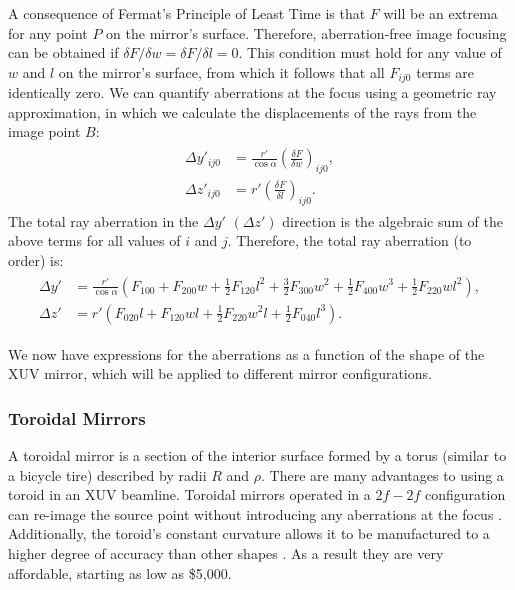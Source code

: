 A consequence of Fermat's Principle of Least Time is that $F$ will be an extrema for any point $P$ on the mirror's surface. Therefore, aberration-free image focusing can be obtained if $\delta F/\delta w = \delta F / \delta l = 0$. This condition must hold for any value of $w$ and $l$ on the mirror's surface, from which it follows that all $F_{ij0}$ terms are identically zero. We can quantify aberrations at the focus using a geometric ray approximation, in which we calculate the displacements of the rays from the image point $B$:
\begin{gather}
\begin{aligned}
\Delta y'_{ij0} &= \frac{r'}{\cos \alpha} \left( \frac{\delta F}{\delta w} \right)_{ij0}, \\
\Delta z'_{ij0} &= r' \left( \frac{\delta F}{\delta l} \right)_{ij0}.
\end{aligned}
\end{gather}
The total ray aberration in the $\Delta y'$ $(\Delta z')$ direction is the algebraic sum of the above terms for all values of $i$ and $j$. Therefore, the total ray aberration (to  order) is:
\begin{gather}
\begin{aligned}
\Delta y' &= \frac{r'}{\cos \alpha} \left( F_{100} + F_{200} w + \frac{1}{2} F_{120} l^2 + \frac{3}{2} F_{300} w^2  + \frac{1}{2} F_{400} w^3 + \frac{1}{2} F_{220} w l^2 \right), \\
\Delta z' &= r' \left( F_{020} l + F_{120} w l + \frac{1}{2} F_{220} w^2 l + \frac{1}{2} F_{040} l^3 \right).
\end{aligned}
\label{eqn:abberation_expansion}
\end{gather}

We now have expressions for the aberrations as a function of the shape of the XUV mirror, which will be applied to different mirror configurations.

\subsubsection{Toroidal Mirrors}

A toroidal mirror is a section of the interior surface formed by a torus (similar to a bicycle tire) described by radii $R$ and $\rho$. There are many advantages to using a toroid in an XUV beamline. Toroidal mirrors operated in a $2f-2f$ configuration can re-image the source point without introducing any aberrations at the focus \cite{chirlaAttosecondPulseGeneration2011}. Additionally, the toroid's constant curvature allows it to be manufactured to a higher degree of accuracy than other shapes \cite{howellsMirrorsSynchrotronRadiationBeamlines1994}. As a result they are very affordable, starting as low as \$5,000.

